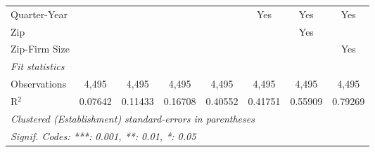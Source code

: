 \begin{tabular}{lccccccc}
   Quarter-Year     &                &                &                &                 & Yes             & Yes           & Yes\\  
   Zip              &                &                &                &                 &                 & Yes           & \\  
   Zip-Firm Size    &                &                &                &                 &                 &               & Yes\\  
   \midrule
   \emph{Fit statistics}\\
   Observations     & 4,495          & 4,495          & 4,495          & 4,495           & 4,495           & 4,495         & 4,495\\  
   R$^2$            & 0.07642        & 0.11433        & 0.16708        & 0.40552         & 0.41751         & 0.55909       & 0.79269\\  
   \midrule \midrule
   \multicolumn{8}{l}{\emph{Clustered (Establishment) standard-errors in parentheses}}\\
   \multicolumn{8}{l}{\emph{Signif. Codes: ***: 0.001, **: 0.01, *: 0.05}}\\
\end{tabular}
\par\endgroup


